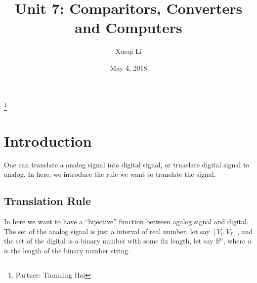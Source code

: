 \documentclass[aps,prl,reprint]{revtex4-1}
\begin{document}
\title{Unit 7: Comparitors, Converters and Computers}
\author{Xueqi Li}
\thanks{Partner: Tianming Hai}
\noaffiliation
\date{May 4, 2018}




\maketitle

\section{Introduction}
    One can translate a analog signal into digital signal, or trnaslate digital signal to analog. In here, we introduce the rule we want to translate the signal.
    \subsection{Translation Rule}
    In here we want to have a ``bijective'' function between agalog signal and digital. The set of the analog signal is just a interval of real number, let say $[V_i,V_f]$, and the set of the digital is a binary number with some fix length, let say $\mathbb{B}^n$, where $n$ is the length of the binary number string. 
\end{document}
